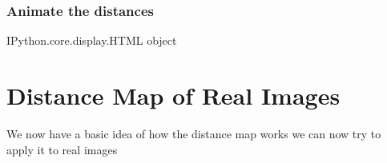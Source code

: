 \documentclass[letterpaper,10pt,english]{sphinxmanual}
\begin{document}
\begin{sphinxVerbatim}[commandchars=\\\{\}]
  
\end{sphinxVerbatim}


\subsection{Animate the distances}
\label{\detokenize{06-AdvancedShapeAndTexture:animate-the-distances}}
\begin{sphinxVerbatim}[commandchars=\\\{\}]
\end{sphinxVerbatim}

\begin{sphinxVerbatim}[commandchars=\\\{\}]
\PYGZlt{}IPython.core.display.HTML object\PYGZgt{}
\end{sphinxVerbatim}


\chapter{Distance Map of Real Images}
\label{\detokenize{06-AdvancedShapeAndTexture:distance-map-of-real-images}}
\sphinxAtStartPar
We now have a basic idea of how the distance map works we can now try to apply it to real images
\end{document}
